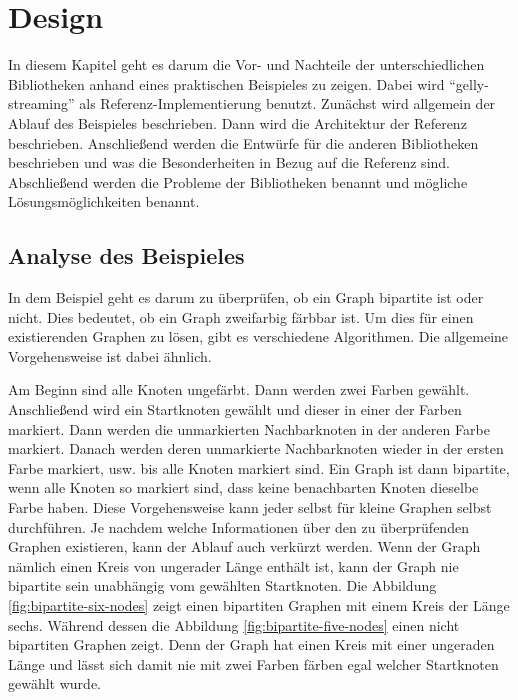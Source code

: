 \chapter{Design}
In diesem Kapitel geht es darum die Vor- und Nachteile der unterschiedlichen
Bibliotheken anhand eines praktischen Beispieles zu zeigen. Dabei wird
\enquote{gelly-streaming} als Referenz-Implementierung benutzt. Zunächst wird
allgemein der Ablauf des Beispieles beschrieben. Dann wird die Architektur
der Referenz beschrieben. Anschließend werden die Entwürfe für die anderen
Bibliotheken beschrieben und was die Besonderheiten in Bezug auf die Referenz
sind. Abschließend werden die Probleme der Bibliotheken benannt und mögliche
Lösungsmöglichkeiten benannt.

\section{Analyse des Beispieles}
In dem Beispiel geht es darum zu überprüfen, ob ein Graph bipartite ist oder
nicht. Dies bedeutet, ob ein Graph zweifarbig färbbar ist. Um dies für einen
existierenden Graphen zu lösen, gibt es verschiedene Algorithmen. Die allgemeine
Vorgehensweise ist dabei ähnlich.

Am Beginn sind alle Knoten ungefärbt. Dann werden zwei Farben gewählt.
Anschließend wird ein Startknoten gewählt und dieser in einer der Farben markiert.
Dann werden die unmarkierten Nachbarknoten in der anderen Farbe markiert. Danach
werden deren unmarkierte Nachbarknoten wieder in der ersten Farbe markiert, usw.
bis alle Knoten markiert sind. Ein Graph ist dann bipartite, wenn alle Knoten so
markiert sind, dass keine benachbarten Knoten dieselbe Farbe haben. Diese
Vorgehensweise kann jeder selbst für kleine Graphen selbst durchführen. Je nachdem
welche Informationen über den zu überprüfenden Graphen existieren, kann der Ablauf
auch verkürzt werden. Wenn der Graph nämlich einen Kreis von ungerader Länge
enthält ist, kann der Graph nie bipartite sein unabhängig vom gewählten
Startknoten. Die Abbildung \ref{fig:bipartite-six-nodes} zeigt einen bipartiten
Graphen mit einem Kreis der Länge sechs. Während dessen die Abbildung \ref{fig:bipartite-five-nodes}
einen nicht bipartiten Graphen zeigt. Denn der Graph hat einen Kreis mit einer
ungeraden Länge und lässt sich damit nie mit zwei Farben färben egal welcher
Startknoten gewählt wurde. 

